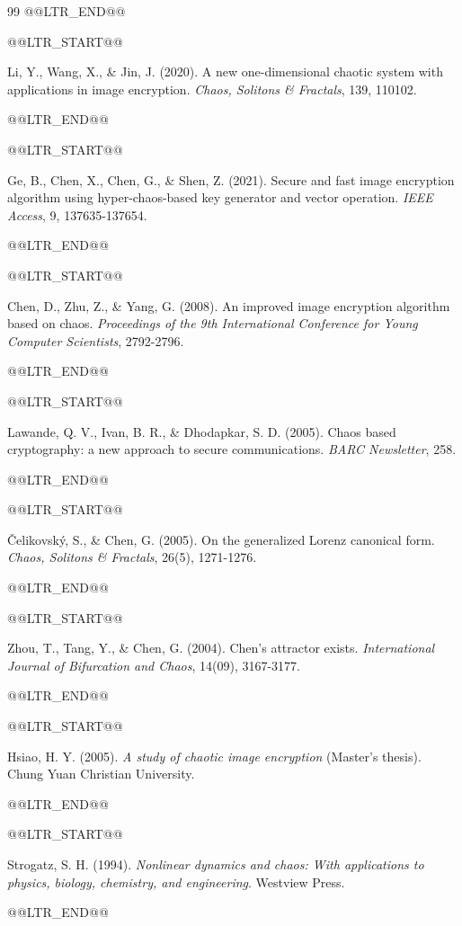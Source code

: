 \begin{thebibliography}{99}
@@LTR_END@@

@@LTR_START@@

 Li, Y., Wang, X., \& Jin, J. (2020). A new one-dimensional chaotic system with applications in image encryption. \textit{Chaos, Solitons \& Fractals}, 139, 110102.

@@LTR_END@@

@@LTR_START@@

 Ge, B., Chen, X., Chen, G., \& Shen, Z. (2021). Secure and fast image encryption algorithm using hyper-chaos-based key generator and vector operation. \textit{IEEE Access}, 9, 137635-137654.

@@LTR_END@@

@@LTR_START@@

 Chen, D., Zhu, Z., \& Yang, G. (2008). An improved image encryption algorithm based on chaos. \textit{Proceedings of the 9th International Conference for Young Computer Scientists}, 2792-2796.

@@LTR_END@@

@@LTR_START@@

 Lawande, Q. V., Ivan, B. R., \& Dhodapkar, S. D. (2005). Chaos based cryptography: a new approach to secure communications. \textit{BARC Newsletter}, 258.

@@LTR_END@@

@@LTR_START@@

 Čelikovský, S., \& Chen, G. (2005). On the generalized Lorenz canonical form. \textit{Chaos, Solitons \& Fractals}, 26(5), 1271-1276.

@@LTR_END@@

@@LTR_START@@

 Zhou, T., Tang, Y., \& Chen, G. (2004). Chen's attractor exists. \textit{International Journal of Bifurcation and Chaos}, 14(09), 3167-3177.

@@LTR_END@@

@@LTR_START@@

 Hsiao, H. Y. (2005). \textit{A study of chaotic image encryption} (Master's thesis). Chung Yuan Christian University.

@@LTR_END@@

@@LTR_START@@

 Strogatz, S. H. (1994). \textit{Nonlinear dynamics and chaos: With applications to physics, biology, chemistry, and engineering}. Westview Press.

@@LTR_END@@


\end{thebibliography}
